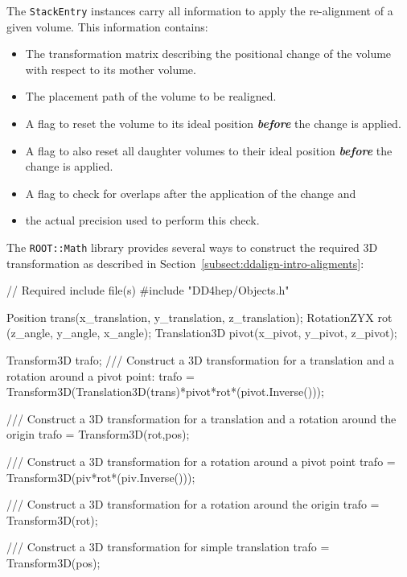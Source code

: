 \documentclass[10pt,a4paper]{article}
\begin{document}
\noindent
The {\tt StackEntry} instances carry all information to apply the re-alignment 
of a given volume. This information contains:
\begin{itemize}\itemcompact
\item The transformation matrix describing the positional change of the volume
    with respect to its mother volume.
\item The placement path of the volume to be realigned.
\item A flag to reset the volume to its ideal position {\it\bf before} the 
    change is applied.
\item A flag to also reset all daughter volumes to their 
    ideal position {\it\bf before} the change is applied.
\item A flag to check for overlaps after the application of the change and
\item the actual precision used to perform this check.
\end{itemize}

\noindent
The {\tt ROOT::Math} library provides several ways to construct the required
3D transformation as described in Section~\ref{subsect:ddalign-intro-aligments}:
\begin{code}
// Required include file(s)
#include "DD4hep/Objects.h"

    Position      trans(x_translation, y_translation, z_translation);
    RotationZYX   rot  (z_angle, y_angle, x_angle);
    Translation3D pivot(x_pivot, y_pivot, z_pivot);

    Transform3D trafo;
    /// Construct a 3D transformation for a translation and a rotation around a pivot point:
    trafo = Transform3D(Translation3D(trans)*pivot*rot*(pivot.Inverse()));

    /// Construct a 3D transformation for a translation and a rotation around the origin
    trafo = Transform3D(rot,pos);

    /// Construct a 3D transformation for a rotation around a pivot point
    trafo = Transform3D(piv*rot*(piv.Inverse()));

    /// Construct a 3D transformation for a rotation around the origin
    trafo = Transform3D(rot);

    /// Construct a 3D transformation for simple translation
    trafo = Transform3D(pos);

\end{code}
\end{document}
